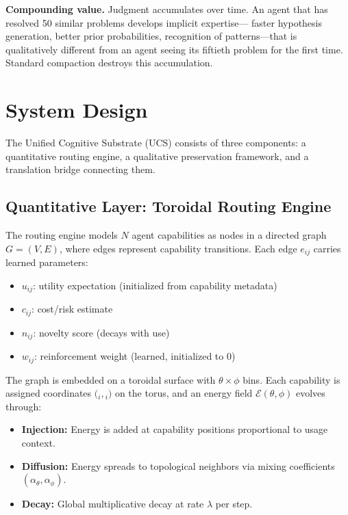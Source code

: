 \documentclass[11pt,a4paper]{article}
\begin{document}
\textbf{Compounding value.} Judgment accumulates over time. An agent
that has resolved 50 similar problems develops implicit expertise---
faster hypothesis generation, better prior probabilities, recognition
of patterns---that is qualitatively different from an agent seeing its
fiftieth problem for the first time. Standard compaction destroys this
accumulation.


\section{System Design}
\label{sec:design}

The Unified Cognitive Substrate (UCS) consists of three components:
a quantitative routing engine, a qualitative preservation framework,
and a translation bridge connecting them.

\subsection{Quantitative Layer: Toroidal Routing Engine}

The routing engine models $N$ agent capabilities as nodes in a
directed graph $G = (V, E)$, where edges represent capability
transitions. Each edge $e_{ij}$ carries learned parameters:

\begin{itemize}[leftmargin=*]
\item $u_{ij}$: utility expectation (initialized from capability metadata)
\item $c_{ij}$: cost/risk estimate
\item $n_{ij}$: novelty score (decays with use)
\item $w_{ij}$: reinforcement weight (learned, initialized to 0)
\end{itemize}

The graph is embedded on a toroidal surface with $\theta \times \phi$
bins. Each capability is assigned coordinates $($\theta$_i, $\phi$_i)$ on the
torus, and an energy field $\mathcal{E}(\theta, \phi)$ evolves through:

\begin{itemize}[leftmargin=*]
\item \textbf{Injection:} Energy is added at capability positions
  proportional to usage context.
\item \textbf{Diffusion:} Energy spreads to topological neighbors
  via mixing coefficients $(\alpha_\theta, \alpha_\phi)$.
\item \textbf{Decay:} Global multiplicative decay at rate $\lambda$
  per step.
\end{itemize}
\end{document}
